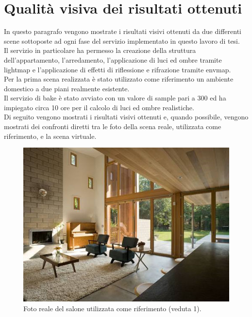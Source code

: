 \section{Qualità visiva dei risultati ottenuti}
\label{sec:chapter_prove_sperimentali_qualita_visiva}

In questo paragrafo vengono mostrate i risultati visivi ottenuti da due differenti scene sottoposte ad ogni fase del servizio implementato in questo lavoro di tesi.
\\ 
Il servizio in particolare ha permesso la creazione della struttura dell’appartamento, l’arredamento, l’applicazione di luci ed ombre tramite lightmap e l’applicazione di effetti di riflessione e rifrazione tramite envmap.
\\
Per la prima scena realizzata è stato utilizzato come riferimento un ambiente domestico a due piani realmente esistente.
\\
Il servizio di bake  è stato avviato con un valore di sample pari a 300 ed ha impiegato circa 10 ore per il calcolo di luci ed ombre realistiche.
\\
Di seguito vengono mostrati i risultati visivi ottenuti e, quando possibile, vengono mostrati dei confronti diretti tra le foto della scena reale, utilizzata come riferimento, e la scena virtuale.
\\
\begin{figure}[htb]
 \centering
 \includegraphics[width=1\linewidth]{images/chapter_prove_sperimentali/scena1_reale.jpg}\hfill
 \caption[Ambiente reale: Salone, veduta 1]{Foto reale del salone utilizzata come riferimento (veduta 1).}
 \label{fig:prove_sperimentali_qualita_visiva_scena1_reale}
\end{figure}
